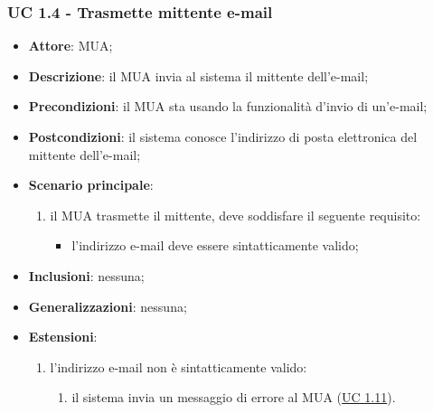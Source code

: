     \subsubsection{UC 1.4 - Trasmette mittente e-mail} \label{sec:UC1.4}
    \begin{itemize}
        \item \textbf{Attore}: MUA;
        \item \textbf{Descrizione}: il MUA invia al sistema il mittente dell'e-mail;
        \item \textbf{Precondizioni}: il MUA sta usando la funzionalità d'invio di un'e-mail;
        \item \textbf{Postcondizioni}: il sistema conosce l'indirizzo di posta elettronica del mittente dell'e-mail;
        \item \textbf{Scenario principale}:
            \begin{enumerate}
                \item il MUA trasmette il mittente, deve soddisfare il seguente requisito:
                    \begin{itemize}
                        \item l'indirizzo e-mail deve essere sintatticamente valido;
                    \end{itemize}
            \end{enumerate}
        \item \textbf{Inclusioni}: nessuna;
        \item \textbf{Generalizzazioni}: nessuna;
        \item \textbf{Estensioni}:
            \begin{enumerate}[label=\alph*.]
                \item l'indirizzo e-mail non è sintatticamente valido:
                \begin{enumerate}[label=\arabic*.]
                    \item il sistema invia un messaggio di errore al MUA (\hyperref[sec:UC1.11]{UC 1.11}).
                \end{enumerate}
            \end{enumerate}
    \end{itemize}

